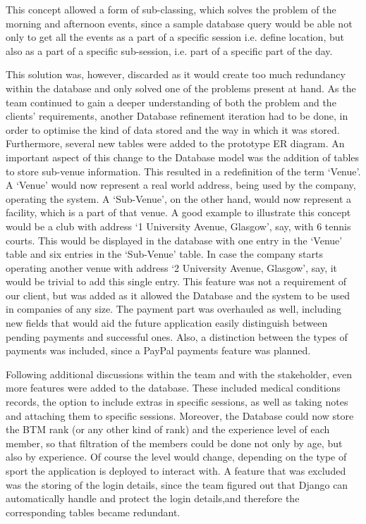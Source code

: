 \documentclass{l3proj}
\begin{document}
This concept allowed a form of sub-classing, which solves the problem of the morning and afternoon events, since a sample database query would be able not only to get all the events as a part of a specific session i.e. define location, but also as a part of a specific sub-session, i.e. part of a specific part of the day.\\
\par This solution was, however, discarded as it would create too much redundancy within the database and only solved one of the problems present at hand. As the team continued to gain a deeper understanding of both the problem and the clients’ requirements, another Database refinement iteration had to be done, in order to optimise the kind of data stored and the way in which it was stored. Furthermore, several new tables were added to the prototype ER diagram. An important aspect of this change to the Database model was the addition of tables to store sub-venue information. This resulted in a redefinition of the term `Venue'. A `Venue' would now represent a real world address, being used by the company, operating the system. A `Sub-Venue', on the other hand, would now represent a facility, which is a part of that venue. A good example to illustrate this concept would be a club with address `1 University Avenue, Glasgow', say, with 6 tennis courts. This would be displayed in the database with one entry in the `Venue' table and six entries in the `Sub-Venue' table. In case the company starts operating another venue with address `2 University Avenue, Glasgow', say, it would be trivial to add this single entry. This feature was not a requirement of our client, but was added as it allowed the Database and the system to be used in companies of any size. The payment part was overhauled as well, including new fields that would aid the future application easily distinguish between pending payments and successful ones. Also, a distinction between the types of payments was included, since a PayPal payments feature was planned.\\
\par Following additional discussions within the team and with the stakeholder, even more features were added to the database. These included medical conditions records, the option to include extras in specific sessions, as well as taking notes and attaching them to specific sessions. Moreover, the Database could now store the BTM rank (or any other kind of rank) and the experience level of each member, so that filtration of the members could be done not only by age, but also by experience.  Of course the level would change, depending on the type of sport the application is deployed to interact with. A feature that was excluded was the storing of the login details, since the team figured out that Django can automatically handle and protect the login details,and therefore the corresponding tables became redundant.\\
\end{document}

